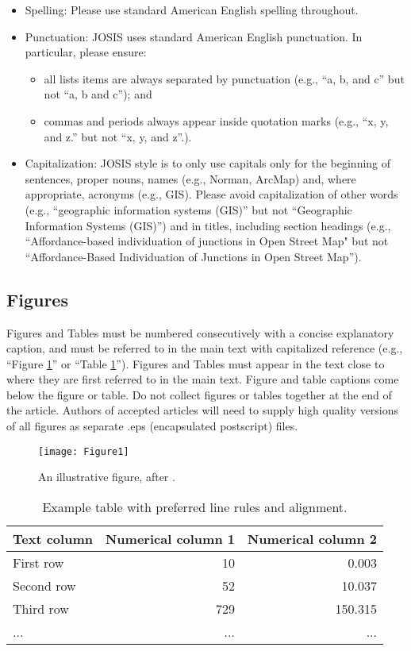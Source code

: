 \documentclass{josis}
\begin{document}
\begin{itemize}
\item Spelling: Please use standard American English spelling throughout.
\item Punctuation: JOSIS uses standard American English punctuation. In
particular, please ensure: 
\begin{itemize}
\item all lists items are always separated by
punctuation (e.g., ``a, b, and c'' but not ``a, b and c''); and 
\item commas and periods always appear inside quotation marks (e.g., ``x, y, and z.'' but not ``x, y, and z''.).
\end{itemize}
\item Capitalization: JOSIS style is to only use capitals only for the
beginning of sentences, proper nouns, names (e.g., Norman, ArcMap) and,
where appropriate, acronyms (e.g., GIS). Please avoid capitalization of
other words (e.g., ``geographic information systems (GIS)'' but not
``Geographic Information Systems (GIS)'') and in titles, including section headings (e.g., ``Affordance-based individuation of junctions in Open Street Map" but not ``Affordance-Based Individuation of Junctions in Open Street Map'').
\end{itemize}


\subsection{Figures}
Figures and Tables must be numbered consecutively with a concise explanatory caption, and must be referred to in the main text with capitalized reference (e.g., ``Figure \ref{fig:1}'' or ``Table \ref{tab:1}''). Figures and Tables must appear in the text close to where they are first referred to in the main text. Figure and table captions come below the figure or table. Do not collect figures or tables together at the end of the article. Authors of accepted articles will need to supply high quality versions of all figures as separate .eps (encapsulated postscript) files.  

\begin{figure}[tbh]
\centering
\texttt{[image: Figure1]}
\caption{An illustrative figure, after \cite{huck15.JOSIS}.}\label{fig:1}
\end{figure}

\begin{table}
\centering
\begin{tabular}{lrr}
\hline
Text column & Numerical column 1 & Numerical column 2\\
\hline
First row& 10 & 0.003\\
Second row& 52& 10.037\\
Third row& 729 & 150.315\\
...& ...& ...\\
\hline
\end{tabular}
\caption{Example table with preferred line rules and alignment.}\label{tab:1}
\end{table}
\end{document}

